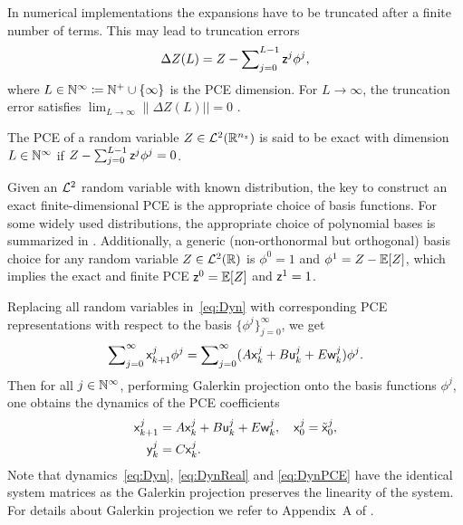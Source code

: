 In numerical implementations the expansions have to be truncated after a finite number of terms. This may lead to truncation errors
\[
	\Delta Z(L) = Z -  \sum\nolimits_{j=0}^{L-1}\mathsf{z}^j \phi^j,
\]
where $L\in\mathbb{N}^\infty\coloneqq \mathbb{N}^+\cup\{\infty\}$ is the PCE dimension. For $L\to\infty$, the truncation error satisfies $\lim_{L\to\infty}\|\Delta Z(L)||=0$ \citep{cameron47orthogonal, ernst12convergence}. 

\begin{defn} \label{def:ExactPCE}
	The PCE of a random variable $Z \in \mathcal{L}^2(\mathbb{R}^{n_z})$ is said to be exact with dimension $L\in\mathbb{N}^\infty$ if $ Z -  \sum_{j=0}^{L-1}\mathsf{z}^j \phi^j=0$.
\end{defn}

\begin{rem} 
	Given an $\mathcal{L}^2$ random variable with known distribution, the key to construct an exact finite-dimensional PCE is the appropriate choice of basis functions. For some widely used distributions, the appropriate choice of polynomial bases is summarized in \citet{xiu02wiener}. Additionally, a generic (non-orthonormal but orthogonal) basis choice for any random variable $Z \in \mathcal{L}^2(\mathbb{R})$ is $\phi^0 = 1$ and $\phi^1 = Z-\mathbb{E}[Z]$, which implies the exact and finite PCE $\mathsf{z}^0 = \mathbb{E}[Z]$ and $\mathsf{z}^1 = 1$.
\end{rem}

Replacing all random variables in~\eqref{eq:Dyn} with corresponding PCE representations with respect to the basis $\{\phi^j\}_{j=0}^{\infty}$, we get
	\begin{equation*}
		\sum\nolimits_{j=0}^\infty \mathsf{x}_{k+1}^j \phi^j= \sum\nolimits_{j=0}^\infty (A\mathsf{x}_k^j + B\mathsf{u}_k^j + E\mathsf{w}_k^j)\phi^j.
	\end{equation*}
Then for all $j\in\mathbb{N}^\infty$, performing Galerkin projection onto the basis functions $\phi^j$, one obtains the dynamics of the PCE coefficients
\begin{subequations} \label{eq:DynPCE}
	\begin{align}	
		\mathsf{x}_{k+1}^j &= A\mathsf{x}_k^j + B\mathsf{u}_k^j + E\mathsf{w}_k^j, \quad \mathsf{x}_0^j=\tilde{\mathsf{x}}_0^j,\\
		\mathsf{y}_k^j &= C\mathsf{x}_k^j.
	\end{align}
\end{subequations}
Note that dynamics~\eqref{eq:Dyn}, \eqref{eq:DynReal} and \eqref{eq:DynPCE} have the identical system matrices as the Galerkin projection preserves the linearity of the system. For details about Galerkin projection we refer to Appendix~A of \citet{pan23stochastic}.

